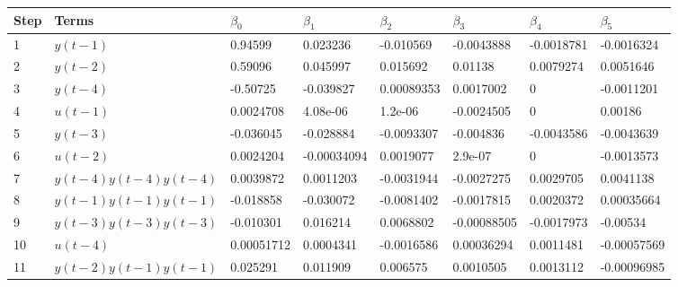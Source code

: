 \begin{tabular}{llllllll}
Step & Terms & $\beta_{0}$ & $\beta_{1}$ & $\beta_{2}$ & $\beta_{3}$ & $\beta_{4}$ & $\beta_{5}$ \\ 
\hline 
1 & $y(t-1)$ & 0.94599 & 0.023236 & -0.010569 & -0.0043888 & -0.0018781 & -0.0016324 \\ 
2 & $y(t-2)$ & 0.59096 & 0.045997 & 0.015692 & 0.01138 & 0.0079274 & 0.0051646 \\ 
3 & $y(t-4)$ & -0.50725 & -0.039827 & 0.00089353 & 0.0017002 & 0 & -0.0011201 \\ 
4 & $u(t-1)$ & 0.0024708 & 4.08e-06 & 1.2e-06 & -0.0024505 & 0 & 0.00186 \\ 
5 & $y(t-3)$ & -0.036045 & -0.028884 & -0.0093307 & -0.004836 & -0.0043586 & -0.0043639 \\ 
6 & $u(t-2)$ & 0.0024204 & -0.00034094 & 0.0019077 & 2.9e-07 & 0 & -0.0013573 \\ 
7 & $y(t-4)y(t-4)y(t-4)$ & 0.0039872 & 0.0011203 & -0.0031944 & -0.0027275 & 0.0029705 & 0.0041138 \\ 
8 & $y(t-1)y(t-1)y(t-1)$ & -0.018858 & -0.030072 & -0.0081402 & -0.0017815 & 0.0020372 & 0.00035664 \\ 
9 & $y(t-3)y(t-3)y(t-3)$ & -0.010301 & 0.016214 & 0.0068802 & -0.00088505 & -0.0017973 & -0.00534 \\ 
10 & $u(t-4)$ & 0.00051712 & 0.0004341 & -0.0016586 & 0.00036294 & 0.0011481 & -0.00057569 \\ 
11 & $y(t-2)y(t-1)y(t-1)$ & 0.025291 & 0.011909 & 0.006575 & 0.0010505 & 0.0013112 & -0.00096985 \\ 
\hline 
\end{tabular}